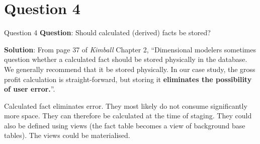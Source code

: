\section*{Question 4}

\begin{frame}[fragile]{Question 4}
	\textbf{Question}: Should calculated (derived) facts be stored?\\\vspace{10pt}
	
	\textbf{Solution}: From page 37 of \textit{Kimball} Chapter 2, ``Dimensional modelers sometimes question whether a calculated fact should be stored physically in the database. We generally recommend that it be stored physically. In our case study, the gross profit calculation is straight-forward, but storing it \textbf{eliminates	the possibility of user error.}''. \\\vspace{5pt}
	
	Calculated fact eliminates error. They most likely do not consume
	significantly more space. They can therefore be calculated at the time of staging. They could also be defined using views (the fact table becomes a view of background base tables). The views could be materialised.
\end{frame}

